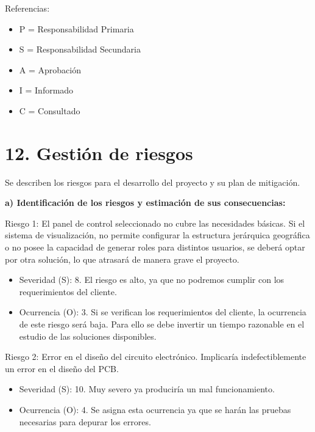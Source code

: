 \documentclass[11pt]{charter}
\begin{document}
{\footnotesize
Referencias:
\begin{itemize}
	\item P = Responsabilidad Primaria
	\item S = Responsabilidad Secundaria
	\item A = Aprobación
	\item I = Informado
	\item C = Consultado
\end{itemize}
} %




\section{12. Gestión de riesgos}
\label{sec:riesgos}
Se describen los riesgos para el desarrollo del proyecto y su plan de mitigación.

\textbf{a) Identificación de los riesgos y estimación de sus consecuencias:}
 
Riesgo 1: El panel de control seleccionado no cubre las necesidades básicas. Si el sistema de visualización, no permite configurar la estructura jerárquica geográfica o no posee la capacidad de generar roles para distintos usuarios, se deberá optar por otra solución, lo que atrasará de manera grave el proyecto.
\begin{itemize}
\item Severidad (S): 8. El riesgo es alto, ya que no podremos cumplir con los requerimientos del cliente.
\item Ocurrencia (O): 3. Si se verifican los requerimientos del cliente, la ocurrencia de este riesgo será baja. Para ello se debe invertir un tiempo razonable en el estudio de las soluciones disponibles.
\end{itemize}   

Riesgo 2: Error en el diseño del circuito electrónico. Implicaría indefectiblemente un error en el diseño del PCB.
\begin{itemize}
\item Severidad (S): 10. Muy severo ya produciría un mal funcionamiento. 
\item Ocurrencia (O): 4. Se asigna esta ocurrencia ya que se harán las pruebas necesarias para depurar los errores.
\end{itemize}
\end{document}
